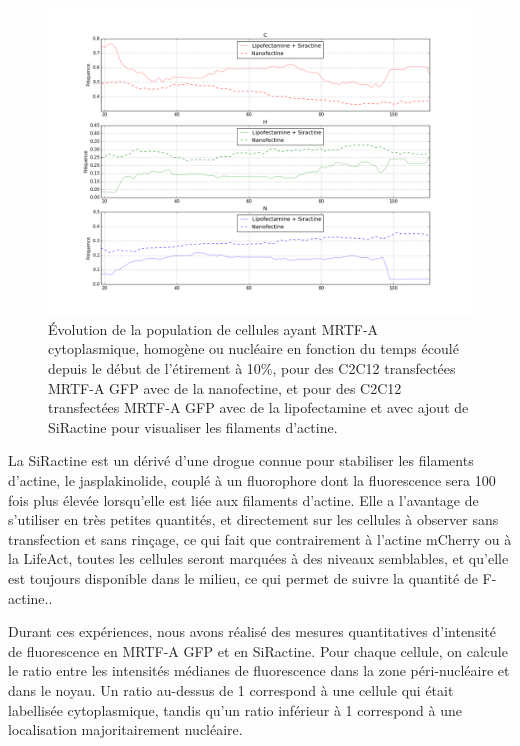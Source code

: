 \begin{figure}
\includegraphics[scale=0.3]{Figures/Et10_Siractine_comparaison.png}
\caption{\'Evolution de la population de cellules ayant MRTF-A cytoplasmique, homogène ou nucléaire en fonction du temps écoulé depuis le début de l'étirement à 10\%, pour des C2C12 transfectées MRTF-A GFP avec de la nanofectine, et pour des C2C12 transfectées MRTF-A GFP avec de la lipofectamine et avec ajout de SiRactine pour visualiser les filaments d'actine. \label{CHN_SiR}}
\end{figure}
La SiRactine est un dérivé d'une drogue connue pour stabiliser les filaments d'actine, le jasplakinolide, couplé à un fluorophore dont la fluorescence sera 100 fois plus élevée lorsqu'elle est liée aux filaments d'actine. 
Elle a l'avantage de s'utiliser en très petites quantités, et directement sur les cellules à observer sans transfection et sans rinçage, ce qui fait que contrairement à l'actine mCherry ou à la LifeAct, toutes les cellules seront marquées à des niveaux semblables, et qu'elle est toujours disponible dans le milieu, ce qui permet de suivre la quantité de F-actine.. 

Durant ces expériences, nous avons réalisé des mesures quantitatives d'intensité de fluorescence en MRTF-A GFP et en SiRactine. Pour chaque cellule, on calcule le ratio entre les intensités médianes de fluorescence dans la zone péri-nucléaire et dans le noyau. Un ratio au-dessus de 1 correspond à une cellule qui était labellisée cytoplasmique, tandis qu'un ratio inférieur à 1 correspond à une localisation majoritairement nucléaire. 


